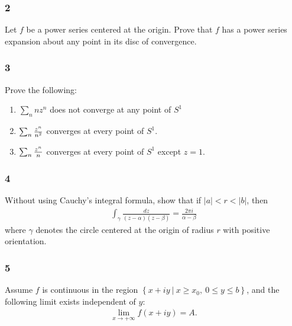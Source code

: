 \hypertarget{section-44}{%
\subsubsection{2}\label{section-44}}

Let \(f\) be a power series centered at the origin. Prove that \(f\) has
a power series expansion about any point in its disc of convergence.

\hypertarget{section-45}{%
\subsubsection{3}\label{section-45}}

Prove the following:

\begin{enumerate}
\def\labelenumi{\alph{enumi}.}
\item
  \(\sum_{n} nz^n\) does not converge at any point of \(S^1\)
\item
  \(\sum_n {z^n \over n^2}\) converges at every point of \(S^1\).
\item
  \(\sum_n {z^n \over n}\) converges at every point of \(S^1\) except
  \(z=1\).
\end{enumerate}

\hypertarget{section-46}{%
\subsubsection{4}\label{section-46}}

Without using Cauchy's integral formula, show that if
\({\left\lvert {a} \right\rvert} < r < {\left\lvert {b} \right\rvert}\),
then
\begin{align*}
\int_{\gamma} \frac{d z}{(z-\alpha)(z-\beta)}=\frac{2 \pi i}{\alpha-\beta}
\end{align*}
where \(\gamma\) denotes the circle centered at the origin of radius
\(r\) with positive orientation.

\hypertarget{section-47}{%
\subsubsection{5}\label{section-47}}

Assume \(f\) is continuous in the region
\(\left\{{x+iy {~\mathrel{\Big|}~}x\geq x_0, ~ 0\leq y \leq b}\right\}\),
and the following limit exists independent of \(y\):
\begin{align*}
\lim_{x\to +\infty}f(x+iy) = A
.\end{align*}

